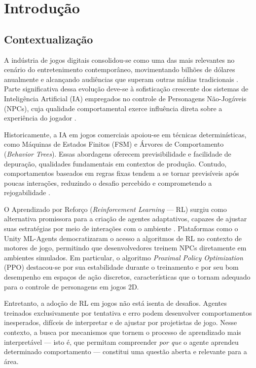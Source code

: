 \chapter{Introdução}
\label{cap:introducao}

\section{Contextualização}
\label{sec:contextualizacao}

A indústria de jogos digitais consolidou-se como uma das mais relevantes no
cenário do entretenimento contemporâneo, movimentando bilhões de dólares
anualmente e alcançando audiências que superam outras mídias tradicionais
\cite{newzoo2024}. Parte significativa dessa evolução deve-se à sofisticação
crescente dos sistemas de Inteligência Artificial (IA) empregados no controle
de Personagens Não-Jogáveis (NPCs), cuja qualidade comportamental exerce
influência direta sobre a experiência do jogador \cite{millington2019ai}.

Historicamente, a IA em jogos comerciais apoiou-se em técnicas determinísticas,
como Máquinas de Estados Finitos (FSM) e Árvores de Comportamento
(\textit{Behavior Trees}). Essas abordagens oferecem previsibilidade e
facilidade de depuração, qualidades fundamentais em contextos de produção.
Contudo, comportamentos baseados em regras fixas tendem a se tornar
previsíveis após poucas interações, reduzindo o desafio percebido e
comprometendo a rejogabilidade \cite{yannakakis2018artificial}.

O Aprendizado por Reforço (\textit{Reinforcement Learning} --- RL) surgiu como
alternativa promissora para a criação de agentes adaptativos, capazes de
ajustar suas estratégias por meio de interações com o ambiente
\cite{sutton2018reinforcement}. Plataformas como o Unity ML-Agents
\cite{juliani2020unity} democratizaram o acesso a algoritmos de RL no contexto
de motores de jogo, permitindo que desenvolvedores treinem NPCs diretamente
em ambientes simulados. Em particular, o algoritmo \textit{Proximal Policy
Optimization} (PPO) \cite{schulman2017ppo} destacou-se por sua estabilidade
durante o treinamento e por seu bom desempenho em espaços de ação discretos,
características que o tornam adequado para o controle de personagens em jogos
2D.

Entretanto, a adoção de RL em jogos não está isenta de desafios. Agentes
treinados exclusivamente por tentativa e erro podem desenvolver
comportamentos inesperados, difíceis de interpretar e de ajustar por
projetistas de jogo. Nesse contexto, a busca por mecanismos que tornem o
processo de aprendizado mais interpretável --- isto é, que permitam
compreender \textit{por que} o agente aprendeu determinado comportamento ---
constitui uma questão aberta e relevante para a área.

